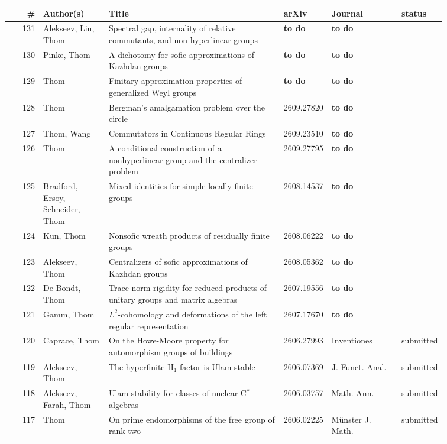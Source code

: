 \documentclass[11pt, landscape]{article}
\begin{document}
\begin{center}
\begin{longtable}{r|p{0.15\linewidth}|p{0.40\linewidth}|p{0.08\linewidth}|p{0.16\linewidth}|p{0.07\linewidth}}
\textbf{\#} & \textbf{Author(s)} & \textbf{Title} & \textbf{arXiv} & \textbf{Journal} & \textbf{status} \\
\hline
131 & Alekseev, Liu, Thom & Spectral gap, internality of relative commutants, and non-hyperlinear groups & {\bf to do} & {\bf to do} & \\
130 & Pinke, Thom & A dichotomy for sofic approximations of Kazhdan groups & {\bf to do} & {\bf to do} & \\
129 & Thom & Finitary approximation properties of generalized Weyl groups & {\bf to do} & {\bf to do} & \\
128 & Thom & Bergman's amalgamation problem over the circle & 2609.27820 & {\bf to do} & \\
127 & Thom, Wang & Commutators in Continuous Regular Rings & 2609.23510 & {\bf to do} & \\
126 & Thom & A conditional construction of a nonhyperlinear group and the centralizer problem & 2609.27795 & {\bf to do} & \\
125 & Bradford, Ersoy, Schneider, Thom &  Mixed identities for simple locally finite groups & 2608.14537 & {\bf to do} &  \\
124 & Kun, Thom & Nonsofic wreath products  of residually finite  groups & 2608.06222 & {\bf to do} & \\
123 & Alekseev, Thom & Centralizers of soﬁc approximations
of Kazhdan groups &  2608.05362 & {\bf to do} & \\
122 & De Bondt, Thom & Trace-norm rigidity for reduced products of
unitary groups and matrix algebras & 2607.19556 & {\bf to do} & \\
121 & Gamm, Thom & $L^2$-cohomology and deformations of
the left regular representation & 2607.17670 & {\bf to do} & \\
120 & Caprace, Thom & On the Howe-Moore property for automorphism groups of buildings & 	2606.27993 & Inventiones & submitted\\
119 & Alekseev, Thom & The hyperfinite II$_1$-factor is Ulam stable & 2606.07369 & J. Funct. Anal. & submitted\\
118 & Alekseev, Farah, Thom & Ulam stability for classes of nuclear C$^*$-algebras & 2606.03757 & Math. Ann. & submitted\\
117 & Thom & On prime endomorphisms of the free group of rank two & 2606.02225 & Münster J. Math. & submitted\\

\end{longtable}
\end{center}
\end{document}

